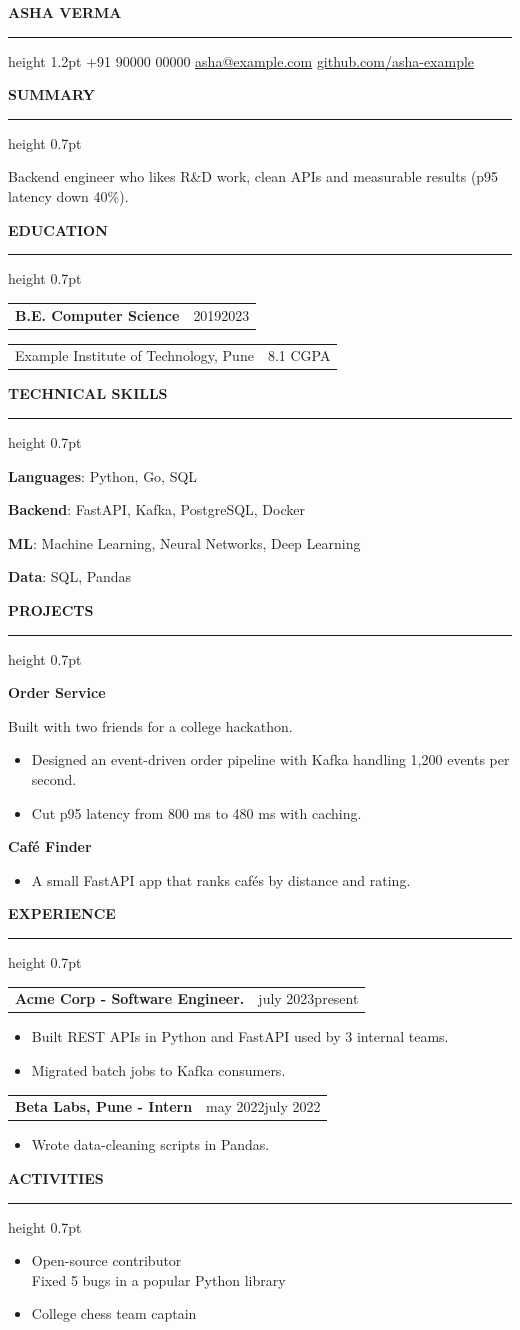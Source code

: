 \documentclass[11pt,letterpaper]{article}
\makeatletter
\newcommand{\resumesection}[1]{%
  \par\vspace{7pt}%
  {\fontfamily{phv}\selectfont\bfseries\fontsize{10.8}{11.5}\selectfont
   \MakeUppercase{#1}}\par
  \vspace{2pt}%
  \hrule height 0.7pt
  \vspace{3pt}%
}
\newcommand{\datedrow}[2]{%
  \begin{tabularx}{\textwidth}{@{}Xr@{}}
    #1 & #2
  \end{tabularx}\vspace{-1pt}%
}
\newcommand{\skill}[2]{\textbf{#1}: #2\par}
\makeatother
\begin{document}
\begin{center}
  {\selectfont\bfseries\fontsize{25}{27}\selectfont ASHA VERMA}\par
  \vspace{2pt}\hrule height 1.2pt\vspace{4pt}
  {\fontsize{10.5}{12}\selectfont
+91 90000 00000 \enspace\textbullet\enspace
\href{mailto:asha@example.com}{asha@example.com}\enspace\textbullet\enspace
\href{https://github.com/asha-example}{\underline{github.com/asha-example}}
  }
\end{center}
\vspace{-3pt}

\resumesection{Summary}
{\fontsize{11}{13.5}\selectfont
Backend engineer who likes R\&D work, clean APIs and measurable results (p95 latency down 40\%).\par}

\resumesection{Education}
\datedrow{\textbf{B.E. Computer Science}}{2019\textendash{}2023}
\datedrow{Example Institute of Technology, Pune}{8.1 CGPA}

\resumesection{Technical Skills}
\skill{Languages}{Python, Go, SQL}
\skill{Backend}{FastAPI, Kafka, PostgreSQL, Docker}
\skill{ML}{Machine Learning, Neural Networks, Deep Learning}
\skill{Data}{SQL, Pandas}

\resumesection{Projects}
\textbf{Order Service}\par
\hspace{1.25em}Built with two friends for a college hackathon.\par
\begin{itemize}
  \item Designed an event-driven order pipeline with Kafka handling 1,200 events per second.
  \item Cut p95 latency from 800 ms to 480 ms with caching.
\end{itemize}
\vspace{2pt}
\textbf{Caf\'{e} Finder}\par
\begin{itemize}
  \item A small FastAPI app that ranks caf\'{e}s by distance and rating.
\end{itemize}

\resumesection{Experience}
\datedrow{\selectfont\bfseries Acme Corp - Software Engineer.}{july 2023\textendash{}present}
\begin{itemize}
  \item Built REST APIs in Python and FastAPI used by 3 internal teams.
  \item Migrated batch jobs to Kafka consumers.
\end{itemize}
\datedrow{\fontfamily{phv}\selectfont\bfseries Beta Labs, Pune - Intern}{may 2022\textendash{}july 2022}
\begin{itemize}
  \item Wrote data-cleaning scripts in Pandas.
\end{itemize}

\resumesection{Activities}
\begin{itemize}
  \item Open-source contributor\\
        \hspace{0.35em}Fixed 5 bugs in a popular Python library
  \item College chess team captain
\end{itemize}
\end{document}
